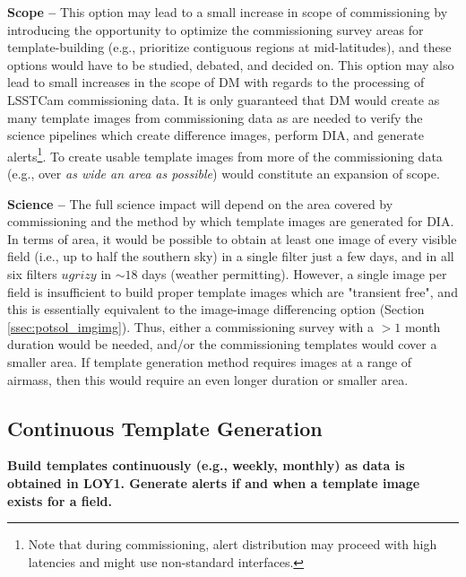 \documentclass[DM,lsstdraft,toc]{lsstdoc}
\begin{document}
{\bf Scope --} This option may lead to a small increase in scope of commissioning by introducing the opportunity to optimize the commissioning survey areas for template-building (e.g., prioritize contiguous regions at mid-latitudes), and these options would have to be studied, debated, and decided on. This option may also lead to small increases in the scope of DM with regards to the processing of LSSTCam commissioning data. It is only guaranteed that DM would create as many template images from commissioning data as are needed to verify the science pipelines which create difference images, perform DIA, and generate alerts\footnote{Note that during commissioning, alert distribution may proceed with high latencies and might use non-standard interfaces.}. To create usable template images from more of the commissioning data (e.g., over {\em as wide an area as possible}) would constitute an expansion of scope.

{\bf Science --} The full science impact will depend on the area covered by commissioning and the method by which template images are generated for DIA. In terms of area, it would be possible to obtain at least one image of every visible field (i.e., up to half the southern sky) in a single filter just a few days, and in all six filters $ugrizy$ in $\sim18$ days (weather permitting). However, a single image per field is insufficient to build proper template images which are "transient free", and this is essentially equivalent to the image-image differencing option (Section \ref{ssec:potsol_imgimg}). Thus, either a commissioning survey with a $>1$ month duration would be needed, and/or the commissioning templates would cover a smaller area. If template generation method requires images at a range of airmass, then this would require an even longer duration or smaller area.


\subsection{Continuous Template Generation}\label{ssec:potsol_cont}

{\bf Build templates continuously (e.g., weekly, monthly) as data is obtained in LOY1. Generate alerts if and when a template image exists for a field.}
\end{document}
